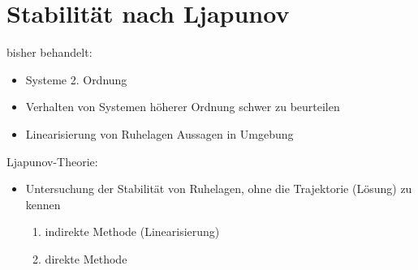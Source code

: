 \documentclass[11pt,a4paper]{article}
\begin{document}
\section{Stabilität nach Ljapunov}
bisher behandelt:
\begin{itemize}
\item Systeme 2. Ordnung
\item Verhalten von Systemen höherer Ordnung schwer zu beurteilen
\item Linearisierung von Ruhelagen Aussagen in Umgebung
\end{itemize}
Ljapunov-Theorie:
\begin{itemize}
\item Untersuchung der Stabilität von Ruhelagen, ohne die Trajektorie (Lösung) zu kennen
\begin{enumerate}
\item indirekte Methode (Linearisierung)
\item direkte Methode
\end{enumerate}
\end{itemize}
\end{document}
